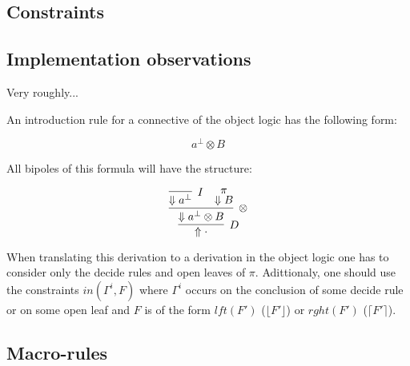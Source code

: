 \documentclass{llncs}
\newcommand\tsl[1]{\hbox{\ensuremath{\mathsl{#1}}}}
\newcommand{\mr}[3]{\tsl{mr}(#1,#2,#3)}
\newcommand{\Oscr}{\mathcal{O}}
\newcommand{\Cscr}{\mathcal{C}}
\newcommand{\Sscr}{\mathcal{S}}
\newcommand{\Tscr}{\mathcal{T}}
\begin{document}
\subsection{Constraints}
\label{sec:constraints}



\subsection{Implementation observations}
\label{sec:implementation}

Very roughly...

An introduction rule for a connective of the object logic has the following
form:

$$a^\bot \otimes B$$

All bipoles of this formula will have the structure:

\[
\infer[D]{ \Uparrow \cdot}{
  \infer[\otimes]{ \Downarrow a^\bot \otimes B}{
    \infer[I]{\Downarrow a^\bot}{}
    &
    \deduce{\Downarrow B}{\pi}
  }
}
\]

When translating this derivation to a derivation in the object logic one has to
consider only the decide rules and open leaves of $\pi$. Adittionaly, one should
use the constraints $in(\Gamma^i, F)$ where $\Gamma^i$ occurs on the conclusion
of some decide rule or on some open leaf and $F$ is of the form
$lft(F')$ ($\lfloor F' \rfloor$) or $rght(F')$ ($\lceil F' \rceil$).

\subsection{Macro-rules}
\label{sec:macro_def}



\begin{comment}
Then, the set of macro-rules,
$\mr{F}{\Cscr}{\Oscr}{\Tscr}{\Sscr}$, that can introduce a formula, $F$,
given a root side-formula context $\Sscr$, is represented by a list of
closed leaves
$\Cscr$, a list of open leaves $\Oscr$, and a set of sets of constraints,
$\Tscr$.
\end{comment}
\end{document}
